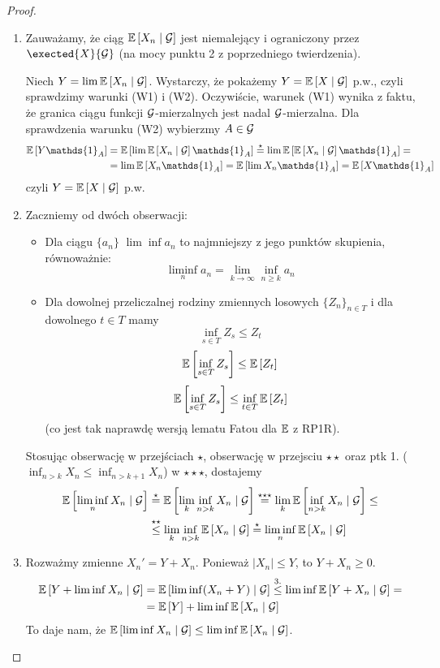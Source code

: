 \begin{proof}
  \begin{enumerate}
    \item Zauważamy, że ciąg $\expected{X_n}{\set{G}}$ jest niemalejący i ograniczony przez $\exected{X}{\set{G}}$ (na mocy punktu 2 z poprzedniego twierdzenia).

      Niech $Y=\lim\expected{X_n}{\set{G}}$. Wystarczy, że pokażemy $Y=\expected{X}{\set{G}}$ p.w., czyli sprawdzimy warunki (W1) i (W2). Oczywiście, warunek (W1) wynika z faktu, że granica ciągu funkcji $\mathcal{G}$-mierzalnych jest nadal $\mathcal{G}$-mierzalna. Dla sprawdzenia warunku (W2) wybierzmy $A\in\mathcal{G}$
      \begin{align*}
        \expected{Y\mathds{1}_A}&=\expected{\lim\expected{X_n}{\set{G}}\mathds{1}_A}\overset{\star}{=}\lim\expected{\expected{X_n}{\set{G}}\mathds{1}_A}=\\
                                &=\lim\expected{X_n\mathds{1}_A}=\expected{\lim X_n\mathds{1}_A}=\expected{X\mathds{1}_A}
      \end{align*}
      czyli $Y=\expected{X}{\set{G}}$ p.w.
    \item Zaczniemy od dwóch obserwacji:
      \begin{itemize}
        \item Dla ciągu $\{a_n\}$ $\lim\inf a_n$ to najmniejszy z jego punktów skupienia, równoważnie:
          $$\liminf_na_n=\lim_{k\to\infty}\inf_{n\geq k}a_n$$
        \item[{\color{green}\PHrosette}] Dla dowolnej przeliczalnej rodziny zmiennych losowych $\{Z_n\}_{n\in T}$ i dla dowolnego $t\in T$ mamy
          $$\inf_{s\in T}Z_s\leq Z_t$$
          $$\expected{\inf_{s\in T} Z_s}\leq\expected{Z_t}$$
          $$\expected{\inf_{s\in T} Z_s}\leq\inf_{t\in T}\expected{Z_t}$$
          (co jest tak naprawdę wersją lematu Fatou dla $\expected$ z RP1R).
      \end{itemize}
      Stosując obserwację \PHtunny w przejściach $\star$, obserwację \PHrosette w przejsciu $\star\star$ oraz ptk 1. ($\inf_{n>k}X_n\leq \inf_{n>k+1}X_n$) w $\star\star\star$, dostajemy
      \begin{align*}
        \expected{\liminf_n X_n}{\set{G}}&\overset{\star}{=}\expected{\lim_k\inf_{n>k}X_n}{\set{G}}\overset{\star\star\star}{=}\lim_k\expected{\inf_{n>k}X_n}{\set{G}}\leq\\
                                         &\overset{\star\star}{\leq}\lim_k\inf_{n>k}\expected{X_n}{\set{G}}\overset{\star}{=}\liminf_n\expected{X_n}{\set{G}}
      \end{align*}
    \item Rozważmy zmienne $X_n'=Y+X_n$. Ponieważ $|X_n|\leq Y$, to $Y+X_n\geq 0$.
      \begin{align*}
        \expected{Y+\liminf X_n}{\set{G}}&=\expected{\liminf(X_n+Y)}{\set{G}}\overset{3.}{\leq}\liminf\expected{Y+X_n}{\set{G}}=\\
                                         &=\expected{Y}+\liminf\expected{X_n}{\set{G}}
      \end{align*}
      To daje nam, że $\expected{\liminf X_n}{\set{G}}\leq\liminf\expected{X_n}{\set{G}}$.


\end{enumerate}
\end{proof}
